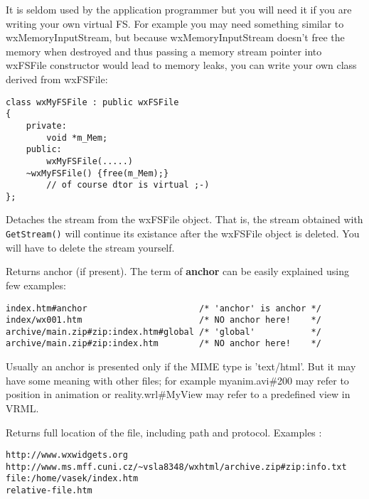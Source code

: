 
It is seldom used by the application programmer but you will need it if
you are writing your own virtual FS. For example you may need something
similar to wxMemoryInputStream, but because wxMemoryInputStream
doesn't free the memory when destroyed and thus passing a memory stream
pointer into wxFSFile constructor would lead to memory leaks, you
can write your own class derived from wxFSFile:

\begin{verbatim}
class wxMyFSFile : public wxFSFile
{
    private:
        void *m_Mem;
    public:
        wxMyFSFile(.....)
	~wxMyFSFile() {free(m_Mem);}
	    // of course dtor is virtual ;-)
};
\end{verbatim}

\label{wxfsfiledetachstream}


Detaches the stream from the wxFSFile object. That is, the
stream obtained with {\tt GetStream()} will continue its existance
after the wxFSFile object is deleted. You will have to delete
the stream yourself.

\label{wxfsfilegetanchor}


Returns anchor (if present). The term of {\bf anchor} can be easily
explained using few examples:

\begin{verbatim}
index.htm#anchor                      /* 'anchor' is anchor */
index/wx001.htm                       /* NO anchor here!    */
archive/main.zip#zip:index.htm#global /* 'global'           */
archive/main.zip#zip:index.htm        /* NO anchor here!    */
\end{verbatim}

Usually an anchor is presented only if the MIME type is 'text/html'.
But it may have some meaning with other files;
for example myanim.avi\#200 may refer to position in animation
or reality.wrl\#MyView may refer to a predefined view in VRML.

\label{wxfsfilegetlocation}


Returns full location of the file, including path and protocol. 
Examples : 

\begin{verbatim}
http://www.wxwidgets.org
http://www.ms.mff.cuni.cz/~vsla8348/wxhtml/archive.zip#zip:info.txt
file:/home/vasek/index.htm
relative-file.htm
\end{verbatim}

